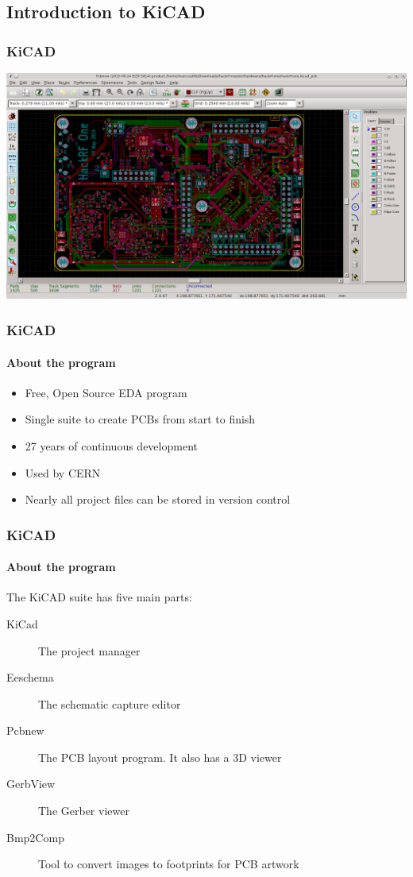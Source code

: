 \documentclass[]{beamer}
\begin{document}
\subsection[KiCAD]{Introduction to KiCAD}
\begin{frame}
    \frametitle{KiCAD}
    \includegraphics[width=0.85\paperwidth,keepaspectratio]{images/KiCad_Pcbnew_OpenGL.png}
\end{frame}

\begin{frame}
    \frametitle{KiCAD}
    \framesubtitle{About the program}
    \begin{itemize}
        \item{Free, Open Source EDA program}
        \item{Single suite to create PCBs from start to finish}
        \item{27 years of continuous development}
        \item{Used by CERN}
        \item{Nearly all project files can be stored in version control}
    \end{itemize}
\end{frame}

\begin{frame}
    \frametitle{KiCAD}
    \framesubtitle{About the program}
    The KiCAD suite has five main parts:
    \begin{description}
        \item[KiCad]{The project manager}
        \item[Eeschema]{The schematic capture editor}
        \item[Pcbnew]{The PCB layout program. It also has a 3D viewer}
        \item[GerbView]{The Gerber viewer}
        \item[Bmp2Comp]{Tool to convert images to footprints for PCB artwork}
    \end{description}
\end{frame}
\end{document}

